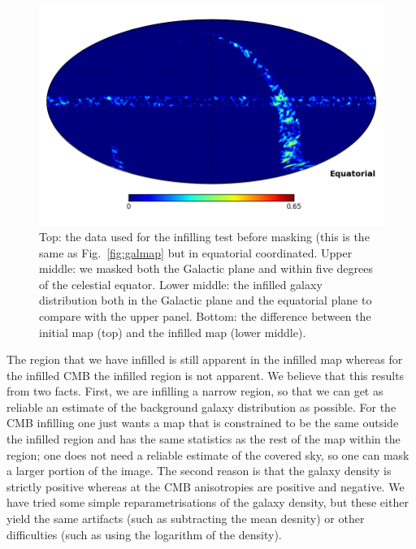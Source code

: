\documentclass[useAMS,usenatbib]{mn2e}
\begin{document}
\begin{figure}
  \includegraphics[width=\columnwidth,clip,trim=0 0.4in 0 0]{infill_test_diffC.png}
  \caption{Top: the data used for the infilling test before masking
    (this is the same as Fig.~\ref{fig:galmap} but in equatorial
    coordinated.  Upper middle: we masked both the Galactic plane and within
    five degrees of the celestial equator.  Lower middle: the infilled galaxy
    distribution both in the Galactic plane and the equatorial plane
    to compare with the upper panel. Bottom: the difference between the initial map (top) and the
    infilled map (lower middle).}
  \label{fig:infilling_test}
\end{figure}

The region that we have infilled is still apparent in the infilled map
whereas for the infilled CMB the infilled region is not apparent.  We
believe that this results from two facts.  First, we are infilling a
narrow region, so that we can get as reliable an estimate of the
background galaxy distribution as possible. For the CMB infilling one
just wants a map that is constrained to be the same outside the
infilled region and has the same statistics as the rest of the map
within the region; one does not need a reliable estimate of the
covered sky, so one can mask a larger portion of the image.  The
second reason is that the galaxy density is strictly positive whereas
at the CMB anisotropies are positive and negative.  We have tried some
simple reparametrisations of the galaxy density, but these either yield
the same artifacts (such as subtracting the mean desnity) or other
difficulties (such as using the logarithm of the density).
\end{document}
